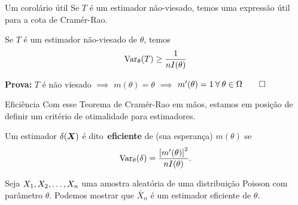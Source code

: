 \begin{frame}{Um corolário útil}
Se $T$ é um estimador não-viesado, temos uma expressão útil para a cota de Cramér-Rao.
\begin{obs}
\label{rmk:variance_unbiased_estimator}
 Se $T$ é um estimador não-viesado de $\theta$, temos
 \begin{equation*}
  \operatorname{Var}_\theta(T) \geq \frac{1}{nI(\theta)}
 \end{equation*}
\end{obs}
\textbf{Prova:} $T$ é não viesado $\implies$ $m(\theta) = \theta$ $\implies$ $m^\prime(\theta) = 1\: \forall\: \theta \in \Omega \qed$
\end{frame}


\begin{frame}{Eficiência}
Com esse Teorema de Cramér-Rao em mãos, estamos em posição de definir um critério de otimalidade para estimadores.
\begin{defn}
 \label{def:efficient_estimator}
 Um estimador $\delta(\boldsymbol{X})$ é dito~\textbf{eficiente} de (sua esperança) $m(\theta)$ se 
 \begin{equation*}
    \operatorname{Var}_\theta(\delta) = \frac{\left[m^\prime(\theta)\right]^2}{nI(\theta)}.
 \end{equation*}
\end{defn}

\begin{exemplo}
\label{ex:poisson_efficient_estimator}
 Seja $X_1, X_2, \ldots, X_n$ uma amostra aleatória de uma distribuição Poisson com parâmetro $\theta$.
 Podemos mostrar que $\bar{X}_n$ é um estimador eficiente de $\theta$.
\end{exemplo}
\end{frame}

